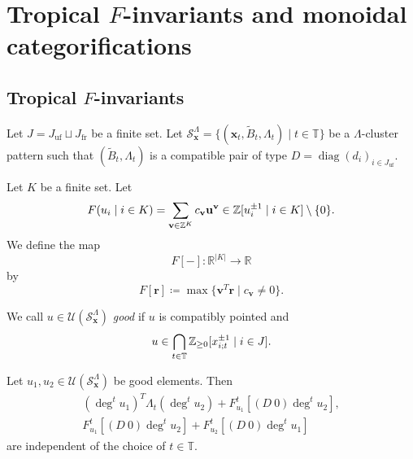 \section{Tropical $F$-invariants and monoidal categorifications}
\label{Sec : tropical F invariants and monoidal categorifications}

\subsection{Tropical $F$-invariants}
\label{ssec : tropical F invariants}

Let $J = J_{\mathrm{uf}} \sqcup J_{\mathrm{fr}}$ be a finite set.
Let
$\mathcal{S}_{\mathbf{x}}^{\Lambda}
= \{(\mathbf{x}_t, \widetilde{B}_t, \Lambda_t)
\mid t \in \mathbb{T}\}$
be a $\Lambda$-cluster pattern such that
$(\widetilde{B}_t, \Lambda_t)$ is a compatible pair of type
$D = \operatorname{diag}(d_i)_{i \in J_{\mathrm{uf}}}$.

\begin{Def}
\label{Def : tropical evaluation of Laurent polynomials}
Let $K$ be a finite set.
Let
\[
F(u_i \mid i \in K)
= \sum_{\mathbf{v} \in \mathbb{Z}^K}c_{\mathbf{v}}\mathbf{u}^{\mathbf{v}}
\in \mathbb{Z}[u_i^{\pm 1} \mid i \in K] \setminus \{0\}.
\]
We define the map
\[
F[-] \colon \mathbb{R}^{|K|} \longrightarrow \mathbb{R}
\]
by
\[
F[\mathbf{r}]
\coloneq \max\{\mathbf{v}^T\mathbf{r} \mid c_{\mathbf{v}} \neq 0\}.
\]
\end{Def}

\begin{Def}
\label{Def : good elements}
We call $u \in \mathcal{U}(\mathcal{S}_{\mathbf{x}}^{\Lambda})$
\emph{good} if $u$ is compatibly pointed and
\[
u \in \bigcap_{t \in \mathbb{T}}
\mathbb{Z}_{\geq 0}[x_{i;t}^{\pm 1} \mid i \in J].
\]
\end{Def}

\begin{Prop}
\label{Prop : tropical invariants of good elements}
Let $u_1, u_2 \in \mathcal{U}(\mathcal{S}_{\mathbf{x}}^{\Lambda})$
be good elements.
Then
\[
\begin{gathered}
(\deg^t u_1)^T\Lambda_t(\deg^t u_2)
+ F_{u_1}^t[(D\ 0)\deg^t u_2], \\
F_{u_1}^t[(D\ 0)\deg^t u_2]
+ F_{u_2}^t[(D\ 0)\deg^t u_1]
\end{gathered}
\]
are independent of the choice of $t \in \mathbb{T}$.
\end{Prop}

